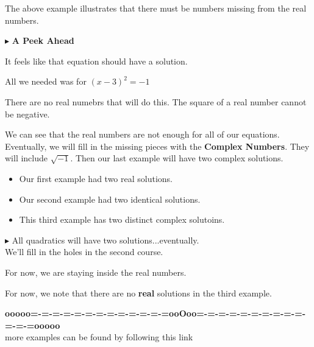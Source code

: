 \documentclass{ximera}
\begin{document}
The above example illustrates that there must be numbers missing from the real numbers.  


$\blacktriangleright$  \textbf{\textcolor{purple!85!blue}{A Peek Ahead}} 



It feels like that equation should have a solution.  


All we needed was for $(x-3)^2 = -1$ 

There are no real numebrs that will do this.  The square of a real number cannot be negative. 




We can see that the real numbers are not enough for all of our equations.  Eventually, we will fill in the missing pieces with the \textbf{Complex Numbers}.  They will include $\sqrt{-1}$.  Then our last example will have two complex solutions.  


\begin{itemize}
\item Our first example had two real solutions.  
\item Our second example had two identical solutions.  
\item This third example has two distinct complex solutoins. 
\end{itemize}



$\blacktriangleright$ All quadratics will have two solutions...eventually. \\

We'll fill in the holes in the second course.









For now, we are staying inside the real numbers.



For now, we note that there are no \textbf{real} solutions in the third example.

























\begin{center}
\textbf{\textcolor{green!50!black}{ooooo=-=-=-=-=-=-=-=-=-=-=-=-=ooOoo=-=-=-=-=-=-=-=-=-=-=-=-=ooooo}} \\

more examples can be found by following this link\\ 

\end{center}
\end{document}
